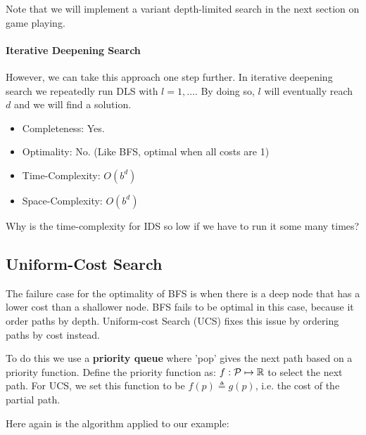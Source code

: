 \documentclass[10pt]{article}
\begin{document}
\noindent Note that we will implement a variant depth-limited search in the next section on game playing.

\paragraph{Iterative Deepening Search}

However, we can take this approach one step further. In iterative deepening search we repeatedly run DLS with $l = 1, \ldots$. By doing so, $l$ will eventually reach $d$ and we will find a solution. 

\begin{itemize}
\item Completeness: Yes.
\item Optimality: No. (Like BFS, optimal when all costs are 1)
\item Time-Complexity: $O(b^d)$ 
\item Space-Complexity: $O(b^d)$ 
\end{itemize}

\begin{exercise}
  Why is the time-complexity for IDS so low if we have to run it some many times?
\end{exercise}


\subsection{Uniform-Cost Search}

The failure case for the optimality of BFS is when there is a deep
node that has a lower cost than a shallower node. BFS fails to be
optimal in this case, because it order paths by depth. Uniform-cost
Search (UCS) fixes this issue by ordering paths by cost instead. 

To do this we use a \textbf{priority queue} where 'pop' gives the next
path based on a priority function. Define the priority function as:
$f:\mathcal{P} \mapsto \mathbb{R}$ to select the next path. For UCS, we set this
function to be $f(p)\triangleq g(p)$, i.e. the cost of the partial
path.

Here again is the algorithm applied to our example:
\end{document}
